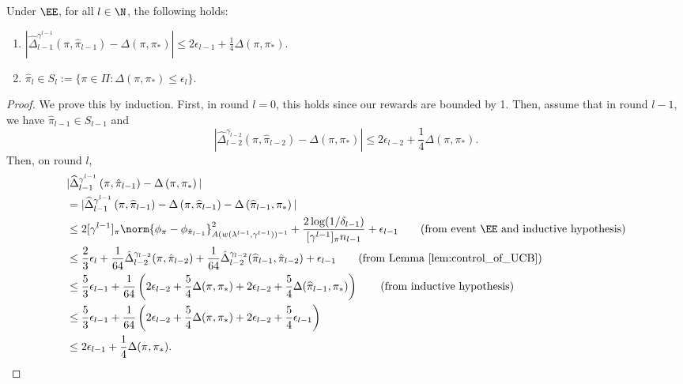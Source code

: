 \documentclass{article}
\newcommand{\pill}{\widehat{\pi}_{l-1}}
\newcommand{\1}{\mathbf{1}}
\begin{document}
\begin{lemma}\label{lem:emp_gaps}
Under $\EE$, for all $l\in\N$, the following holds: 
\begin{enumerate}
    \item $|\widehat{\Delta}_{l-1}^{\gamma^{l-1}}\left(\pi, \pill\right)-\Delta\left(\pi, \pi_{*}\right)| \leq 2\epsilon_{l-1}+ \frac{1}{4}\Delta(\pi,\pi_*).$
    \item $\hat{\pi}_l\in S_l:=\{\pi\in\Pi: \Delta(\pi,\pi_*)\leq \epsilon_l\}$. 
\end{enumerate}
\end{lemma}

\begin{proof}
We prove this by induction. First, in round $l=0$, this holds since our rewards are bounded by 1. Then, assume that in round $l-1$, we have $\pill\in S_{l-1}$ and 
$$
|\widehat{\Delta}_{l-2}^{\gamma_{l-2}}\left(\pi, \hat{\pi}_{l-2}\right)-\Delta\left(\pi, \pi_{*}\right)| \leq 2 \epsilon_{l-2}+ \frac{1}{4}\Delta(\pi,\pi_*).
$$
Then, on round $l$, 
\begin{align*}
    &|\widehat{\Delta}_{l-1}^{\gamma^{l-1}}\left(\pi, \hat{\pi}_{l-1}\right)-\Delta\left(\pi, \pi_*\right)|\\
    &= |\widehat{\Delta}_{l-1}^{\gamma^{l-1}}\left(\pi, \pill\right)-\Delta\left(\pi, \pill\right)-\Delta\left(\pill, \pi_*\right)|\\
    &\leq 2[\gamma^{l-1}]_\pi\norm{\phi_{\pi}-\phi_{\hat{\pi}_{l-1}}}_{A(w(\lambda^{l-1},\gamma^{l-1}))^{-1}}^2+\frac{2\log(1/\delta_{l-1})}{[\gamma^{l-1}]_\pi n_{l-1}}+ \epsilon_{l-1}\tag{from event $\EE$ and inductive hypothesis}\\
    &\leq \frac{2}{3}\epsilon_l+\frac{1}{64}\hat{\Delta}_{l-2}^{\gamma_{l-2}}(\pi,\hat{\pi}_{l-2})+\frac{1}{64}\hat{\Delta}_{l-2}^{\gamma_{l-2}}(\pill,\hat{\pi}_{l-2})+\epsilon_{l-1}\tag{from Lemma~\ref{lem:control_of_UCB}}\\
    &\leq \frac{5}{3}\epsilon_{l-1}+\frac{1}{64}\left(2\epsilon_{l-2}+\frac{5}{4}\Delta(\pi,\pi_*)+2\epsilon_{l-2}+\frac{5}{4}\Delta(\pill,\pi_*)\right)\tag{from inductive hypothesis}\\
    &\leq \frac{5}{3}\epsilon_{l-1}+\frac{1}{64}\left(2\epsilon_{l-2}+\frac{5}{4}\Delta(\pi,\pi_*)+2\epsilon_{l-2}+\frac{5}{4}\epsilon_{l-1}\right)\\
    &\leq 2\epsilon_{l-1}+\frac{1}{4}\Delta(\pi,\pi_*).
\end{align*}


\end{proof}
\end{document}

